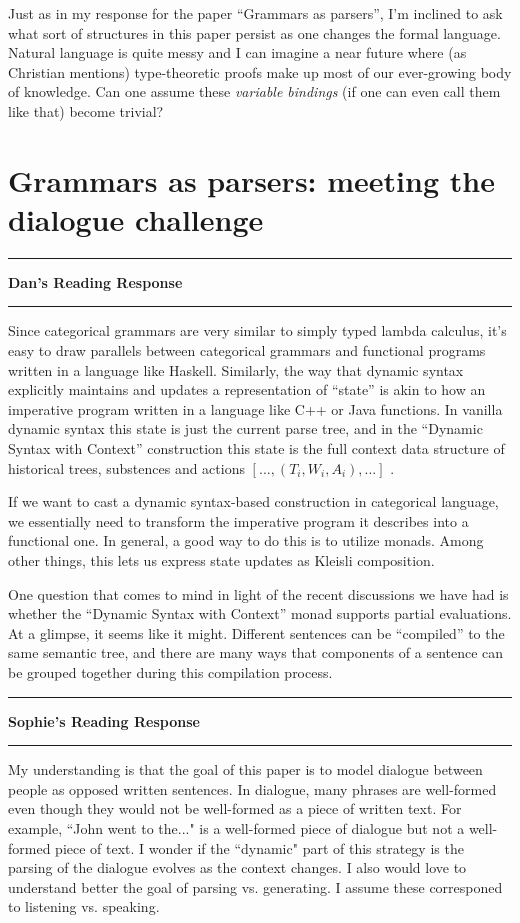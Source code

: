 \documentclass{amsart}
\newcommand{\iam}[1]{
  \vspace{0.25em}
  \hrule
  \vspace{0.25em}
  \textbf{{#1}'s Reading Response}
  \vspace{0.25em}
  \hrule
  \vspace{1em}
}
\begin{document}
Just as in my response for the paper ``Grammars as parsers'', I'm inclined to ask what sort of structures in this paper persist as one changes the formal language.
Natural language is quite messy and I can imagine a near future where (as
Christian mentions) type-theoretic proofs make up most of our ever-growing body
of knowledge.
Can one assume these \textit{variable bindings} (if one can even call them like that) become trivial?



\section{Grammars as parsers: meeting the dialogue challenge}
\label{sec:grammars}

\iam{Dan}
Since categorical grammars are very similar to simply typed lambda calculus, it's easy to draw parallels between categorical grammars and functional programs written in a language like Haskell. Similarly, the way that dynamic syntax explicitly maintains and updates a representation of ``state'' is akin to how an imperative program written in a language like C++ or Java functions. In vanilla dynamic syntax this state is just the current parse tree, and in the ``Dynamic Syntax with Context'' construction this state is the full context data structure of historical trees, substences and actions $[...,(T_i,W_i,A_i),...]$ .

If we want to cast a dynamic syntax-based construction in categorical language, we essentially need to transform the imperative program it describes into a functional one. In general, a good way to do this is to utilize monads. Among other things, this lets us express state updates as Kleisli composition.

One question that comes to mind in light of the recent discussions we have had is whether the ``Dynamic Syntax with Context'' monad supports partial evaluations. At a glimpse, it seems like it might. Different sentences can be ``compiled'' to the same semantic tree, and there are many ways that components of a sentence can be grouped together during this compilation process.

\iam{Sophie}
My understanding is that the goal of this paper is to model dialogue between people as opposed written sentences. In dialogue, many phrases are well-formed even though they would not be well-formed as a piece of written text. For example, ``John went to the..." is a well-formed piece of dialogue but not a well-formed piece of text. I wonder if the ``dynamic" part of this strategy is the parsing of the dialogue evolves as the context changes. I also would love to understand better the goal of parsing vs. generating. I assume these corresponed to listening vs. speaking.
\end{document}
